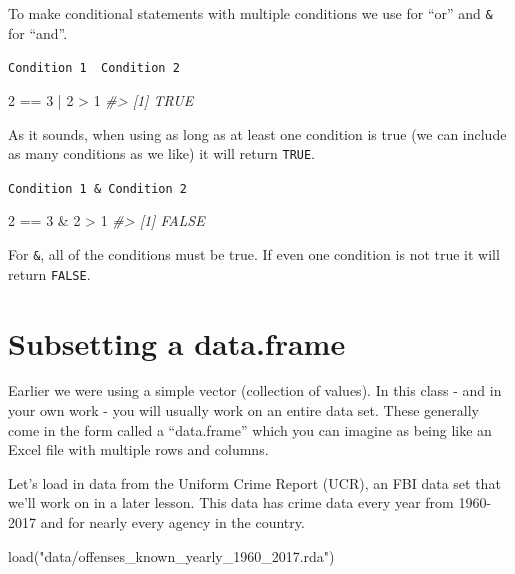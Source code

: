 \documentclass[
  12pt,
  openany]{book}
\newenvironment{Shaded}{\begin{snugshade}}{\end{snugshade}}
\newcommand{\CommentTok}[1]{\textcolor[rgb]{0.37,0.37,0.37}{\textit{#1}}}
\newcommand{\DecValTok}[1]{\textcolor[rgb]{0.06,0.06,0.06}{#1}}
\newcommand{\FunctionTok}[1]{\textcolor[rgb]{0,0,0}{#1}}
\newcommand{\NormalTok}[1]{#1}
\newcommand{\SpecialCharTok}[1]{\textcolor[rgb]{0,0,0}{#1}}
\newcommand{\StringTok}[1]{\textcolor[rgb]{0.5,0.5,0.5}{#1}}
\begin{document}
To make conditional statements with multiple conditions we use \texttt{\textbar{}} for ``or'' and \texttt{\&} for ``and''.

\texttt{Condition\ 1\ \textbar{}\ Condition\ 2}

\begin{Shaded}
\begin{Highlighting}[]
\DecValTok{2} \SpecialCharTok{==} \DecValTok{3} \SpecialCharTok{|} \DecValTok{2} \SpecialCharTok{\textgreater{}} \DecValTok{1}
\CommentTok{\#\textgreater{} [1] TRUE}
\end{Highlighting}
\end{Shaded}

As it sounds, when using \texttt{\textbar{}} as long as at least one condition is true (we can include as many conditions as we like) it will return \texttt{TRUE}.

\texttt{Condition\ 1\ \&\ Condition\ 2}

\begin{Shaded}
\begin{Highlighting}[]
\DecValTok{2} \SpecialCharTok{==} \DecValTok{3} \SpecialCharTok{\&} \DecValTok{2} \SpecialCharTok{\textgreater{}} \DecValTok{1}
\CommentTok{\#\textgreater{} [1] FALSE}
\end{Highlighting}
\end{Shaded}

For \texttt{\&}, all of the conditions must be true. If even one condition is not true it will return \texttt{FALSE}.

\hypertarget{subsetting-a-data.frame}{%
\section{Subsetting a data.frame}\label{subsetting-a-data.frame}}

Earlier we were using a simple vector (collection of values). In this class - and in your own work - you will usually work on an entire data set. These generally come in the form called a ``data.frame'' which you can imagine as being like an Excel file with multiple rows and columns.

Let's load in data from the Uniform Crime Report (UCR), an FBI data set that we'll work on in a later lesson. This data has crime data every year from 1960-2017 and for nearly every agency in the country.

\begin{Shaded}
\begin{Highlighting}[]
\FunctionTok{load}\NormalTok{(}\StringTok{"data/offenses\_known\_yearly\_1960\_2017.rda"}\NormalTok{)}
\end{Highlighting}
\end{Shaded}
\end{document}
